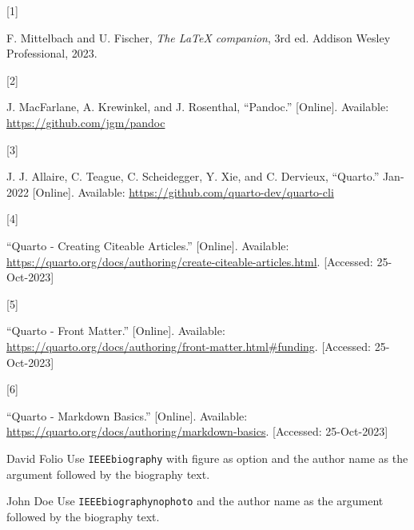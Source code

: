 \documentclass[
  journal,
]{IEEEtran}%
\newlength{\cslhangindent}
\newlength{\csllabelwidth}
\newenvironment{CSLReferences}[2] %
 {\begin{list}{}{%
  \setlength{\itemindent}{0pt}
  \setlength{\leftmargin}{0pt}
  \setlength{\parsep}{0pt}
  \ifodd #1
   \setlength{\leftmargin}{\cslhangindent}
   \setlength{\itemindent}{-1\cslhangindent}
  \fi
  \setlength{\itemsep}{#2\baselineskip}}}
 {\end{list}}
\newcommand{\CSLLeftMargin}[1]{\parbox[t]{\csllabelwidth}{\strut#1\strut}}
\newcommand{\CSLRightInline}[1]{\parbox[t]{\linewidth - \csllabelwidth}{\strut#1\strut}}
\theoremstyle{plain}
\theoremstyle{remark}
\providecommand{\bibfont}{\footnotesize}
\begin{document}
\label{refs}
\begin{CSLReferences}{0}{0}
\CSLLeftMargin{{[}1{]} }%
\CSLRightInline{F. Mittelbach and U. Fischer, \emph{The {LaTeX}
companion}, 3rd ed. {Addison Wesley Professional}, 2023. }

\CSLLeftMargin{{[}2{]} }%
\CSLRightInline{J. MacFarlane, A. Krewinkel, and J. Rosenthal,
{``{Pandoc}.''} {[}Online{]}. Available:
\url{https://github.com/jgm/pandoc}}

\CSLLeftMargin{{[}3{]} }%
\CSLRightInline{J. J. Allaire, C. Teague, C. Scheidegger, Y. Xie, and C.
Dervieux, {``{Quarto}.''} Jan-2022 {[}Online{]}. Available:
\url{https://github.com/quarto-dev/quarto-cli}}

\CSLLeftMargin{{[}4{]} }%
\CSLRightInline{{``Quarto - {Creating Citeable Articles}.''}
{[}Online{]}. Available:
\url{https://quarto.org/docs/authoring/create-citeable-articles.html}.
{[}Accessed: 25-Oct-2023{]}}

\CSLLeftMargin{{[}5{]} }%
\CSLRightInline{{``Quarto - {Front Matter}.''} {[}Online{]}. Available:
\url{https://quarto.org/docs/authoring/front-matter.html\#funding}.
{[}Accessed: 25-Oct-2023{]}}

\CSLLeftMargin{{[}6{]} }%
\CSLRightInline{{``Quarto - {Markdown Basics}.''} {[}Online{]}.
Available: \url{https://quarto.org/docs/authoring/markdown-basics}.
{[}Accessed: 25-Oct-2023{]}}

\end{CSLReferences}


\ifCLASSOPTIONcaptionsoff
  \newpage
\fi



\pagebreak[3]
\begin{IEEEbiography}{David Folio}
Use \texttt{IEEEbiography} with figure as option and the author name as
the argument followed by the biography text.
\end{IEEEbiography}
\begin{IEEEbiographynophoto}{John Doe}
Use \texttt{IEEEbiographynophoto} and the author name as the argument
followed by the biography text.
\end{IEEEbiographynophoto}
\end{document}
